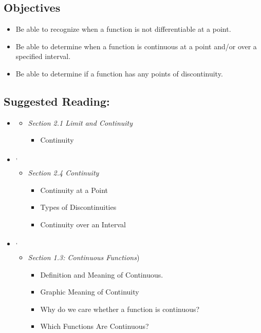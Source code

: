 \vspace{-0.25 in}
\begin{framed}
\subsection*{Objectives}
\begin{itemize}
    \item Be able to recognize when a function is not differentiable at a point.
    \item Be able to determine when a function is continuous at a point and/or over a specified interval.
    \item Be able to determine if a function has any points of discontinuity.
\end{itemize}

\subsection*{Suggested Reading:}
\begin{itemize}
\item \cite{Calaway}\footnotemark[1]
   \begin{itemize}
        \item \emph{Section 2.1 Limit and Continuity}
        \begin{itemize}
            \item Continuity 
        \end{itemize}
    \end{itemize}

\item \cite{openstax}\footnotemark[2]\textsuperscript{,}\footnotemark[3]
    \begin{itemize}
        \item \emph{Section 2.4 Continuity}
        \begin{itemize}
            \item Continuity at a Point
            \item Types of Discontinuities
            \item Continuity over an Interval
        \end{itemize}
    \end{itemize}
\item \cite{Hoffman}\footnotemark[3]\textsuperscript{,}\footnotemark[4]
    \begin{itemize}
        \item \emph{Section 1.3: Continuous Functions})
        \begin{itemize}
            \item Definition and Meaning of Continuous.
           \item Graphic Meaning of Continuity
            \item Why do we care whether a function is continuous?
            \item Which Functions Are Continuous?
        \end{itemize}
        

\end{itemize}
\end{itemize}
\end{framed}
